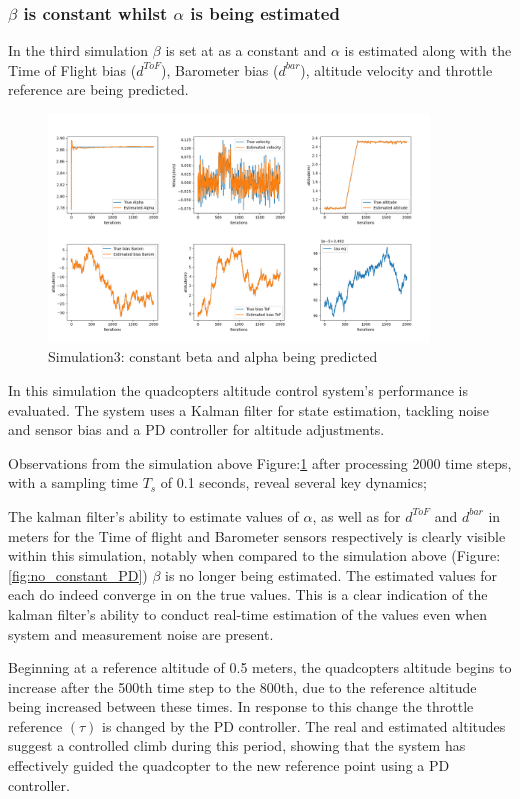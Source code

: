 \documentclass{report}
\begin{document}
\subsubsection*{\(\beta\) is constant whilst \(\alpha\) is being estimated}
In the third simulation \(\beta\) is set at as a constant and \(\alpha\) is
estimated along with the Time of Flight bias (\(d^{ToF}\)), Barometer bias
(\(d^{bar}\)), altitude velocity and throttle reference are being predicted.
\begin{figure}[H]
  \centering
  \includegraphics[width=0.9\textwidth]{Pictures/b_constant_PD.png}
  \caption{Simulation3: constant beta and alpha being predicted}
  \label{fig:b_constant_PD}
\end{figure}
In this simulation the quadcopters altitude control system's performance is
evaluated. The system uses a Kalman filter for state estimation, tackling noise
and sensor bias and a PD controller for altitude adjustments.

Observations from the simulation above Figure:\ref{fig:b_constant_PD} after
processing 2000 time steps, with a sampling time \(T_s\) of 0.1 seconds, reveal
several key dynamics;

The kalman filter’s ability to estimate values of \(\alpha\), as well as for
\(d^{ToF}\) and \(d^{bar}\) in meters for the Time of flight and Barometer
sensors respectively is clearly visible within this simulation, notably when
compared to the simulation above (Figure:\ref{fig:no_constant_PD}) \(\beta\) is
no longer being estimated. The estimated values for each do indeed converge in
on the true values. This is a clear indication of the kalman filter’s ability to
conduct real-time estimation of the values even when system and measurement
noise are present.

Beginning at a reference altitude of 0.5 meters, the quadcopters altitude begins
to increase after the 500th time step to the 800th, due to the reference
altitude being increased between these times. In response to this change the
throttle reference \((\tau)\) is changed by the PD controller. The real and
estimated altitudes suggest a controlled climb during this period, showing that
the system has effectively guided the quadcopter to the new reference point
using a PD controller.
\end{document}
